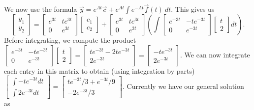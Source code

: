 We now use the formula $\vec y=e^{At}\vec c+e^{At}\int e^{-At}\vec f(t)\ dt.$  This gives us
$$\begin{bmatrix}
y_1\\
y_2
\end{bmatrix}
=
\begin{bmatrix}
e^{3t}&te^{3t}\\
0&e^{3t}
\end{bmatrix}
\begin{bmatrix}
c_1\\
c_2
\end{bmatrix}
+
\begin{bmatrix}
e^{3t}&te^{3t}\\
0&e^{3t}
\end{bmatrix}
\left(\int 
\begin{bmatrix}
e^{-3t}&-te^{-3t}\\
0&e^{-3t}
\end{bmatrix}
\begin{bmatrix}
t\\
2
\end{bmatrix}
dt\right).$$
Before integrating, we compute the product 
$\begin{bmatrix}
e^{-3t}&-te^{-3t}\\
0&e^{-3t}
\end{bmatrix}
\begin{bmatrix}
t\\
2
\end{bmatrix}
 = 
\begin{bmatrix}
te^{-3t}-2te^{-3t}\\
2e^{-3t}
\end{bmatrix}
=
\begin{bmatrix}
-te^{-3t}\\
2e^{-3t}
\end{bmatrix}
$.
We can now integrate each entry in this matrix to obtain (using integration by parts)
$
\begin{bmatrix}
\int -te^{-3t} dt\\
\int 2e^{-3t} dt
\end{bmatrix}
=
\begin{bmatrix}
te^{-3t}/3 +e^{-3t}/9\\
-2e^{-3t}/3
\end{bmatrix}
$.
Currently we have our general solution as 
